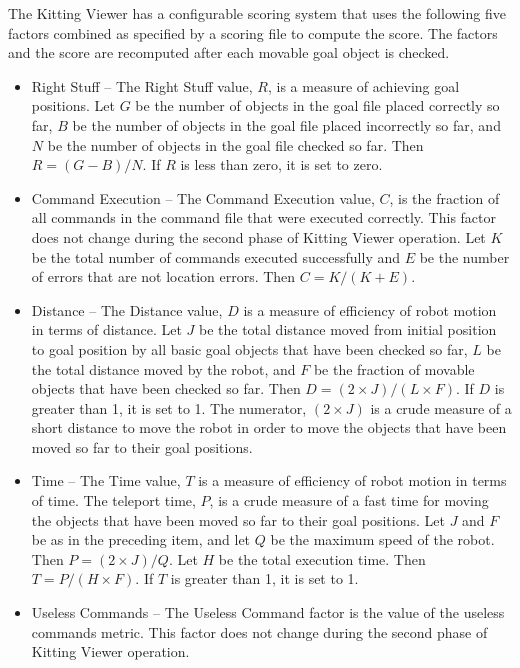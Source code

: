 The Kitting Viewer has a configurable scoring system that uses the
following five factors combined as specified by a scoring file to compute
the score. The factors and the score are recomputed after each movable goal
object is checked.

\begin{itemize}

\item \small \sf Right Stuff \rm \normalsize -- The Right Stuff value, $R$,
  is a measure of achieving goal positions. Let $G$ be the number of
  objects in the goal file placed correctly so far, $B$ be the number of
  objects in the goal file placed incorrectly so far, and $N$ be the number
  of objects in the goal file checked so far. Then $R = (G - B) / N$. If
  $R$ is less than zero, it is set to zero.

\item \small \sf Command Execution \rm \normalsize -- The Command Execution
  value, $C$, is the fraction of all commands in the command file that were
  executed correctly. This factor does not change during the second phase
  of Kitting Viewer operation. Let $K$ be the total number of commands
  executed successfully and $E$ be the number of errors that are not
  location errors. Then $C = K / (K + E)$.

\item \small \sf Distance \rm \normalsize -- The Distance value, $D$ is a
  measure of efficiency of robot motion in terms of distance. Let $J$ be
  the total distance moved from initial position to goal position by all
  basic goal objects that have been checked so far, $L$ be the total
  distance moved by the robot, and $F$ be the fraction of movable objects
  that have been checked so far. Then $D = (2 \times J) / (L \times F)$. If
  $D$ is greater than 1, it is set to 1. The numerator, $(2 \times J)$ is a
  crude measure of a short distance to move the robot in order to move the
  objects that have been moved so far to their goal positions.

\item \small \sf Time \rm \normalsize -- The Time value, $T$ is a measure
  of efficiency of robot motion in terms of time. The teleport time, $P$,
  is a crude measure of a fast time for moving the objects that have been
  moved so far to their goal positions. Let $J$ and $F$ be as in the
  preceding item, and let $Q$ be the maximum speed of the robot. Then
  $P = (2 \times J) / Q$. Let $H$ be the total execution time.
  Then $T = P / (H \times F)$. If $T$ is greater than 1, it is set to 1.

\item \small \sf Useless Commands \rm \normalsize -- The Useless Command
  factor is the value of the useless commands metric. This factor does not
  change during the second phase of Kitting Viewer operation.

\end{itemize}

